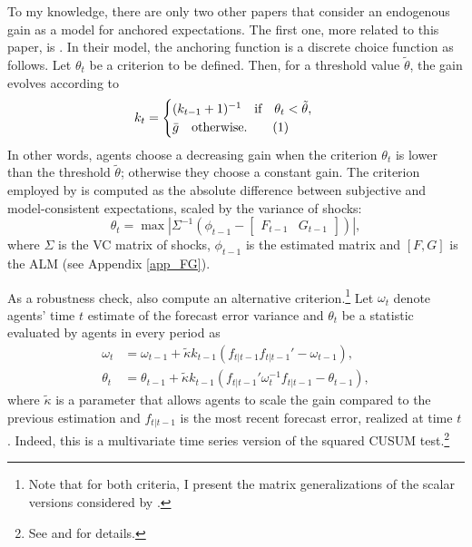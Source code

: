 \documentclass[11pt]{article}
\renewcommand{\[}{\begin{equation}}
\renewcommand{\]}{\end{equation}}
\newcommand\numberthis{\addtocounter{equation}{1}\tag{\theequation}} %
\begin{document}
To my knowledge, there are only two other papers that consider an endogenous gain as a model for anchored expectations. The first one, more related to this paper, is \cite{carvalho2019anchored}. In their model, the anchoring function is a discrete choice function as follows. Let $\theta_t$ be a criterion to be defined. Then, for a threshold value $\tilde{\theta}$, the gain evolves according to
\begin{align*}
k_t & = \begin{cases} (k_{t-1}+1)^{-1} \quad \text{if} \quad \theta_t < \tilde{\theta},  \\ \bar{g}  \quad \text{otherwise.}\numberthis \label{anchoring_kinked}
\end{cases} 
\end{align*}
In other words, agents choose a decreasing gain when the criterion $\theta_t$ is lower than the threshold $\tilde{\theta}$; otherwise they choose a constant gain. The criterion employed by \cite{carvalho2019anchored} is computed as the absolute difference between subjective and model-consistent expectations, scaled by the variance of shocks:
\begin{equation}
\theta_t = \max | \Sigma^{-1} ( \phi_{t-1} - \begin{bmatrix} F_{t-1} & G_{t-1} \end{bmatrix}) |,
\end{equation}
where $\Sigma$ is the VC matrix of shocks, $\phi_{t-1}$ is the estimated matrix and $[F,G]$ is the ALM (see Appendix \ref{app_FG}).

As a robustness check, \cite{carvalho2019anchored} also compute an alternative criterion.\footnote{Note that for both criteria, I present the matrix generalizations of the scalar versions considered by \cite{carvalho2019anchored}.} Let $\omega_t$ denote agents' time $t$ estimate of the forecast error variance and $\theta_t$ be a statistic evaluated by agents in every period as
\begin{align}
\omega_t & =  \omega_{t-1} + \tilde{\kappa} k_{t-1}(f_{t|t-1} f_{t|t-1}'  -\omega_{t-1}),\\
\theta_t & =  \theta_{t-1} + \tilde{\kappa} k_{t-1}(f_{t|t-1}'\omega_t^{-1}f_{t|t-1} -\theta_{t-1}) \label{cusum_crit},
\end{align}
where $\tilde{\kappa}$ is a parameter that allows agents to scale the gain compared to the previous estimation and $f_{t|t-1}$ is the most recent forecast error, realized at time $t$. Indeed, this is a multivariate time series version of the squared CUSUM test.\footnote{See \cite{brown1975techniques} and \cite{lutkepohl2013introduction} for details.}
\end{document}
